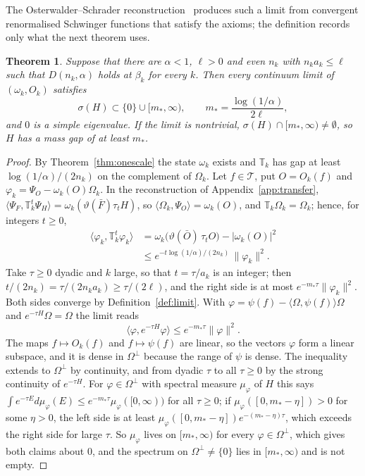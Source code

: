 \documentclass[11pt]{amsart}
\newtheorem{theorem}{Theorem}[section]
\theoremstyle{definition}
\theoremstyle{remark}
\numberwithin{equation}{section}
\newcommand{\ip}[2]{\langle #1,#2\rangle}
\begin{document}
The Osterwalder--Schrader reconstruction~\cite{OS73,OS75} produces such a
limit from convergent renormalised Schwinger functions that satisfy the
axioms; the definition records only what the next theorem uses.

\begin{theorem}\label{thm:transfer}
Suppose that there are $\alpha<1$, $\ell>0$ and even $n_k$ with
$n_ka_k\le\ell$ such that $D(n_k,\alpha)$ holds at $\beta_k$ for every $k$.
Then every continuum limit of $(\omega_k,O_k)$ satisfies
\[
\sigma(H)\subset\{0\}\cup[m_*,\infty),\qquad m_*=\frac{\log(1/\alpha)}{2\ell},
\]
and $0$ is a simple eigenvalue. If the limit is nontrivial,
$\sigma(H)\cap[m_*,\infty)\ne\emptyset$, so $H$ has a mass gap of at least
$m_*$.
\end{theorem}

\begin{proof}
By Theorem~\ref{thm:onescale} the state $\omega_k$ exists and $\mathbb T_k$ has gap
at least $\log(1/\alpha)/(2n_k)$ on the complement of $\Omega_k$. Let $f\in
\mathcal T$, put $O=O_k(f)$ and $\varphi_k=\Psi_O-\omega_k(O)\Omega_k$. In
the reconstruction of Appendix~\ref{app:transfer},
$\ip{\Psi_F}{\mathbb T_k^t\Psi_H}=\omega_k(\vartheta(\bar F)\tau_tH)$, so
$\ip{\Omega_k}{\Psi_O}=\omega_k(O)$, and $\mathbb T_k\Omega_k=\Omega_k$; hence, for integers $t\ge0$,
\[
\begin{split}
\ip{\varphi_k}{\mathbb T_k^t\varphi_k}&=\omega_k\bigl(\vartheta(\bar O)\,\tau_tO\bigr)
-|\omega_k(O)|^2\\
&\le e^{-t\log(1/\alpha)/(2n_k)}\,\|\varphi_k\|^2 .
\end{split}
\]
Take $\tau\ge0$ dyadic and $k$ large, so that $t=\tau/a_k$ is an integer;
then $t/(2n_k)=\tau/(2n_ka_k)\ge\tau/(2\ell)$, and the right side is at most
$e^{-m_*\tau}\|\varphi_k\|^2$. Both sides converge by
Definition~\ref{def:limit}. With $\varphi=\psi(f)-\ip\Omega{\psi(f)}\Omega$
and $e^{-\tau H}\Omega=\Omega$ the limit reads
\[
\ip\varphi{e^{-\tau H}\varphi}\le e^{-m_*\tau}\|\varphi\|^2 .
\]
The maps $f\mapsto O_k(f)$ and $f\mapsto\psi(f)$ are linear, so the vectors
$\varphi$ form a linear subspace, and it is dense in $\Omega^\perp$ because
the range of $\psi$ is dense. The inequality extends to $\Omega^\perp$ by
continuity, and from dyadic $\tau$ to all $\tau\ge0$ by the strong continuity
of $e^{-\tau H}$. For $\varphi\in\Omega^\perp$ with spectral measure
$\mu_\varphi$ of $H$ this says $\int e^{-\tau E}d\mu_\varphi(E)\le e^{-m_*\tau}
\mu_\varphi([0,\infty))$ for all $\tau\ge0$; if $\mu_\varphi([0,m_*-\eta])>0$
for some $\eta>0$, the left side is at least $\mu_\varphi([0,m_*-\eta])
e^{-(m_*-\eta)\tau}$, which exceeds the right side for large $\tau$. So
$\mu_\varphi$ lives on $[m_*,\infty)$ for every $\varphi\in\Omega^\perp$, which
gives both claims about $0$, and the spectrum on $\Omega^\perp\ne\{0\}$ lies in
$[m_*,\infty)$ and is not empty.
\end{proof}
\end{document}
